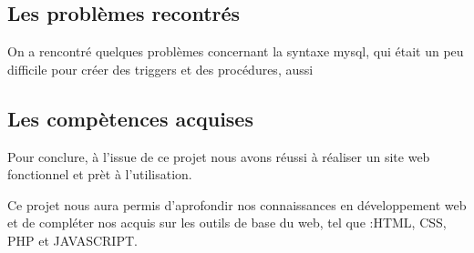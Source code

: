 \documentclass[oneside,11pt,a4paper]{article}
\begin{document}
\subsection{Les problèmes recontrés}
On a rencontré quelques problèmes concernant la syntaxe mysql, qui était un peu difficile pour créer des triggers et des procédures, aussi 

\subsection{Les compètences acquises}

Pour conclure, à l’issue de ce projet nous avons réussi à réaliser un site web fonctionnel et prèt à l'utilisation. 

Ce projet nous aura permis d’aprofondir nos connaissances en développement web et de compléter nos acquis sur les outils de base du web, tel que :HTML, CSS, PHP et JAVASCRIPT.
\end{document}
